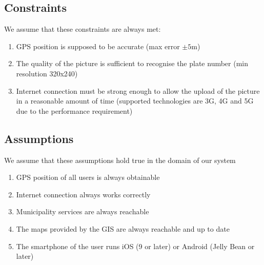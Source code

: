 \subsection{Constraints}
\label{sec:constraints}
	We assume that these constraints are always met:
	\begin{enumerate}[label=\textbf{C\arabic*}]
		\item GPS position is supposed to be accurate (max error $\pm5$m)
		\item The quality of the picture is sufficient to recognise the plate number (min resolution 320x240)
		\item Internet connection must be strong enough to allow the upload of the picture in a reasonable amount of time (supported technologies are 3G, 4G and 5G due to the performance requirement)
	\end{enumerate}
	
\subsection{Assumptions}
	We assume that these assumptions hold true in the domain of our system 
	\begin{enumerate}[label=\textbf{	DA\arabic*}]
		\item GPS position of all users is always obtainable
		\item Internet connection always works correctly
		\item Municipality services are always reachable
		\item The maps provided by the GIS are always reachable and up to date
		\item The smartphone of the user runs iOS (9 or later) or Android (Jelly Bean or later)
	\end{enumerate}
		
\clearpage